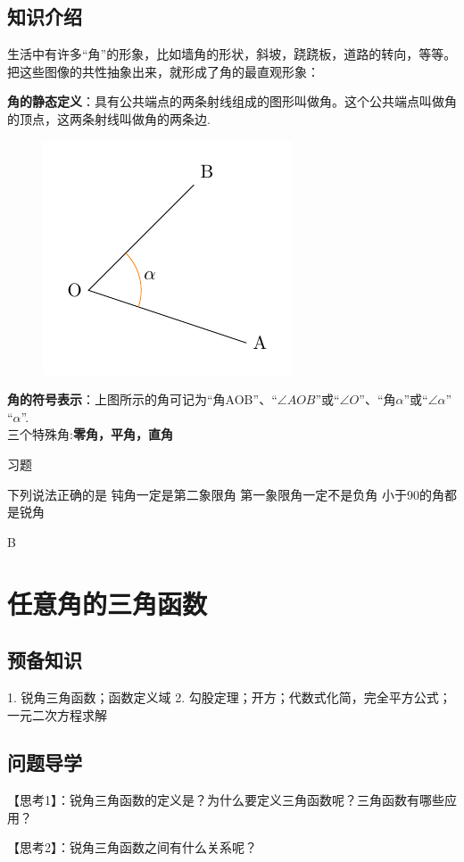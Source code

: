 \subsection{知识介绍}
生活中有许多“角”的形象，比如墙角的形状，斜坡，跷跷板，道路的转向，等等。把这些图像的共性抽象出来，就形成了角的最直观形象：\par
{\bf 角的静态定义}：具有公共端点的两条射线组成的图形叫做角。这个公共端点叫做角的顶点，这两条射线叫做角的两条边.\\
\begin{figure}[!htbp]
  \centering
  \includegraphics[scale=0.8]{Fig.ArbitraryAngle.pdf}
\end{figure}\par
{\bf 角的符号表示}：上图所示的角可记为“角AOB”、“$\angle{AOB}$”或“$\angle O$”、“角$\alpha$”或“$\angle\alpha$”
“$\alpha$”.\\
三个特殊角:{\bf\kaishu 零角，平角，直角}\par
\begin{exercise}{习题}
\item
下列说法正确的是\xz
{}
{钝角一定是第二象限角}
{第一象限角一定不是负角}
{小于90\degree 的角都是锐角}
\begin{answer}B\end{answer}
\end{exercise}

\section{任意角的三角函数}
\subsection{预备知识}
1. 锐角三角函数；函数定义域
2. 勾股定理；开方；代数式化简，完全平方公式；一元二次方程求解
\subsection{问题导学}
{\heiti 【思考1】}：锐角三角函数的定义是？为什么要定义三角函数呢？三角函数有哪些应用？\par
\vspace{12em}
{\heiti 【思考2】}：锐角三角函数之间有什么关系呢？\par
\vspace{12em}



\stoptexercise
